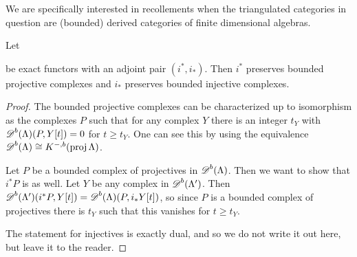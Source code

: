 We are specifically interested in recollements when the triangulated categories in question are (bounded) derived categories of finite dimensional algebras.

\begin{lemma} \label{lem:adjoint_preserves_bounded_proj/inj}
	Let  be exact functors with an adjoint pair $(i^*,i_*)$. Then $i^*$ preserves bounded projective complexes and $i_*$ preserves bounded injective complexes.
	\begin{proof}
		The bounded projective complexes can be characterized up to isomorphism as the complexes $P$ such that for any complex $Y$ there is an integer $t_Y$ with $\operatorname{\mathscr{D}}^b(\Lambda) (P, Y[t])=0$ for $t\geq t_Y$. One can see this by using the equivalence $\operatorname{\mathscr{D}}^b(\Lambda) \cong K^{-,b}(\operatorname{proj}\Lambda)$.
		
		Let $P$ be a bounded complex of projectives in $\operatorname{\mathscr{D}}^b(\Lambda)$. Then we want to show that $i^*P$ is as well. Let $Y$ be any complex in $\operatorname{\mathscr{D}}^b(\Lambda')$. Then $\operatorname{\mathscr{D}}^b(\Lambda')(i^*P, Y[t]) = \operatorname{\mathscr{D}}^b(\Lambda)(P, i_*Y[t])$, so since $P$ is a bounded complex of projectives there is $t_Y$ such that this vanishes for $t \geq t_Y$. 
		
		The statement for injectives is exactly dual, and so we do not write it out here, but leave it to the reader.
	\end{proof}
\end{lemma}

